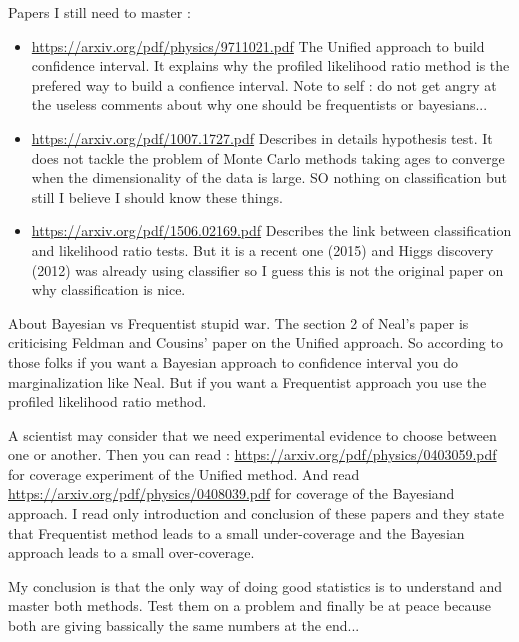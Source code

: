 Papers I still need to master :
\begin{itemize}
 	\item \url{https://arxiv.org/pdf/physics/9711021.pdf} The Unified approach to build confidence interval. It explains why the profiled likelihood ratio method is the prefered way to build a confience interval. Note to self : do not get angry at the useless comments about why one should be frequentists or bayesians...
 	\item \url{https://arxiv.org/pdf/1007.1727.pdf} Describes in details hypothesis test. It does not tackle the problem of Monte Carlo methods taking ages to converge when the dimensionality of the data is large. SO nothing on classification but still I believe I should know these things.
 	\item \url{https://arxiv.org/pdf/1506.02169.pdf} Describes the link between classification and likelihood ratio tests. But it is a recent one (2015) and Higgs discovery (2012) was already using classifier so I guess this is not the original paper on why classification is nice.
 \end{itemize} 


About Bayesian vs Frequentist stupid war.
The section 2 of Neal's paper is criticising Feldman and Cousins' paper on the Unified approach.
So according to those folks if you want a Bayesian approach to confidence interval you do marginalization like Neal.
But if you want a Frequentist approach you use the profiled likelihood ratio method.

A scientist may consider that we need experimental evidence to choose between one or another.
Then you can read : \url{https://arxiv.org/pdf/physics/0403059.pdf} for coverage experiment of the Unified method.
And read \url{https://arxiv.org/pdf/physics/0408039.pdf} for coverage of the Bayesiand approach.
I read only introduction and conclusion of these papers and they state that Frequentist method leads to a small under-coverage and the Bayesian approach leads to a small over-coverage.

My conclusion is that the only way of doing good statistics is to understand and master both methods.
Test them on a problem and finally be at peace because both are giving bassically the same numbers at the end...

